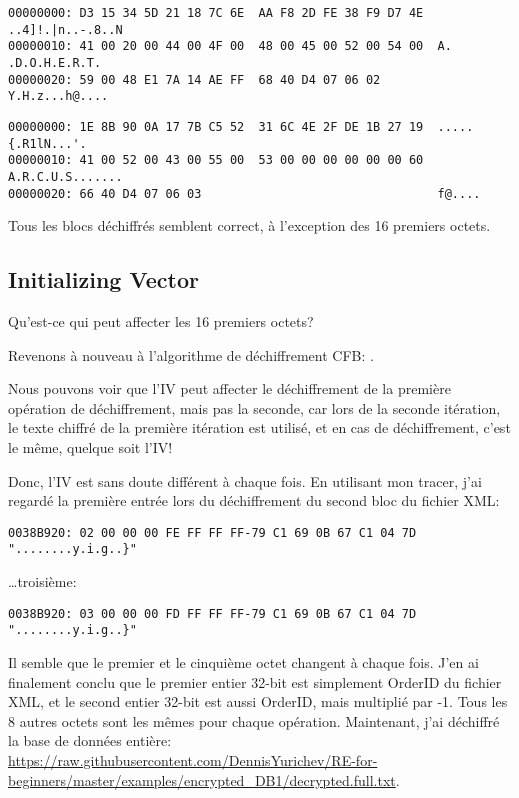 \begin{lstlisting}
00000000: D3 15 34 5D 21 18 7C 6E  AA F8 2D FE 38 F9 D7 4E  ..4]!.|n..-.8..N
00000010: 41 00 20 00 44 00 4F 00  48 00 45 00 52 00 54 00  A. .D.O.H.E.R.T.
00000020: 59 00 48 E1 7A 14 AE FF  68 40 D4 07 06 02        Y.H.z...h@....
\end{lstlisting}

\begin{lstlisting}
00000000: 1E 8B 90 0A 17 7B C5 52  31 6C 4E 2F DE 1B 27 19  .....{.R1lN...'.
00000010: 41 00 52 00 43 00 55 00  53 00 00 00 00 00 00 60  A.R.C.U.S.......
00000020: 66 40 D4 07 06 03                                 f@....
\end{lstlisting}

Tous les blocs déchiffrés semblent correct, à l'exception des 16 premiers octets.

\subsection{Initializing Vector}

Qu'est-ce qui peut affecter les 16 premiers octets?

Revenons à nouveau à l'algorithme de déchiffrement \ac{CFB}: .

Nous pouvons voir que l'\ac{IV} peut affecter le déchiffrement de la première opération
de déchiffrement, mais pas la seconde, car lors de la seconde itération, le texte
chiffré de la première itération est utilisé, et en cas de déchiffrement, c'est le
même, quelque soit l'\ac{IV}!

Donc, l'\ac{IV} est sans doute différent à chaque fois.
En utilisant mon tracer, j'ai regardé la première entrée lors du déchiffrement du
second bloc du fichier \ac{XML}:

\begin{lstlisting}
0038B920: 02 00 00 00 FE FF FF FF-79 C1 69 0B 67 C1 04 7D "........y.i.g..}"
\end{lstlisting}

\dots troisième:

\begin{lstlisting}
0038B920: 03 00 00 00 FD FF FF FF-79 C1 69 0B 67 C1 04 7D "........y.i.g..}"
\end{lstlisting}

Il semble que le premier et le cinquième octet changent à chaque fois.
J'en ai finalement conclu que le premier entier 32-bit est simplement OrderID du fichier
\ac{XML}, et le second entier 32-bit est aussi OrderID, mais multiplié par -1. Tous
les 8 autres octets sont les mêmes pour chaque opération.
Maintenant, j'ai déchiffré la base de données entière:
\url{https://raw.githubusercontent.com/DennisYurichev/RE-for-beginners/master/examples/encrypted_DB1/decrypted.full.txt}.

